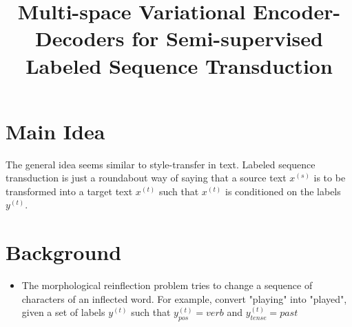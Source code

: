 \documentclass[12pt]{scrartcl}
\begin{document}
\title{Multi-space Variational Encoder-Decoders for Semi-supervised Labeled Sequence Transduction}
\author{}
\date{}
\maketitle

\section{Main Idea}
  The general idea \cite{zhou2017multi} seems similar to style-transfer in text. Labeled sequence transduction is just a roundabout way of saying that a source text $x^{(s)}$ is to be transformed into a target text $x^{(t)}$ such that $x^{(t)}$ is conditioned on the labels $y^{(t)}$.

\section{Background}
\begin{itemize}
  \item The morphological reinflection problem tries to change a sequence of characters of an inflected word. For example, convert "playing" into "played", given a set of labels $y^{(t)}$ such that $y^{(t)}_{pos}=verb$ and $y^{(t)}_{tense}=past$
\end{itemize}
\end{document}
